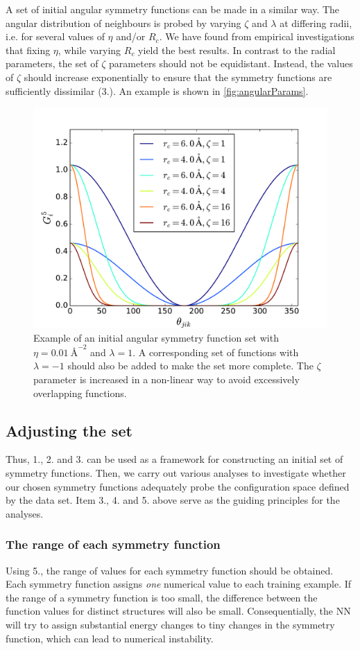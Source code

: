 \documentclass[twoside,english]{uiofysmaster}
\begin{document}
A set of initial angular symmetry functions can be made in a similar way. 
The angular distribution of neighbours is probed by varying $\zeta$ and $\lambda$ at differing radii, i.e. for 
several values of $\eta$ and/or $R_c$. 
We have found from empirical investigations that fixing $\eta$, while varying $R_c$ yield the best results. 
In contrast to the radial parameters, the set of $\zeta$ parameters should not be equidistant. Instead, the values of $\zeta$
should increase exponentially to ensure that the symmetry functions are sufficiently dissimilar (3.). An example is shown in 
\autoref{fig:angularParams}. 
\begin{figure}
\centering
  \includegraphics[width = 0.7\linewidth]{Figures/Implementation/angularParams1.pdf}
  \caption{Example of an initial angular symmetry function set
  with $\eta = \SI{0.01}{\angstrom}^{-2}$ and 
  $\lambda = 1$. A corresponding set of functions with $\lambda = -1$ should also be added to make the set more complete. 
  The $\zeta$ parameter is increased in a non-linear way to avoid excessively overlapping functions. }
  \label{fig:angularParams}
\end{figure}

\subsection{Adjusting the set}
Thus, 1., 2. and 3. can be used as a framework for constructing an initial set of symmetry functions.
Then, we carry out various analyses to investigate whether our chosen symmetry functions 
adequately probe the configuration space defined by the data set. Item 3., 4. and 5. above serve as the
guiding principles for the analyses. 

\subsubsection{The range of each symmetry function}
Using 5., the range of values for each symmetry function should be obtained. Each symmetry function
assigns \textit{one} numerical value to each training example. If the range of a symmetry function is too small, 
the difference between the function values for distinct structures will also be small. Consequentially, 
the NN will try to assign substantial energy changes to tiny changes in the symmetry function, which 
can lead to numerical instability. 
\end{document}
